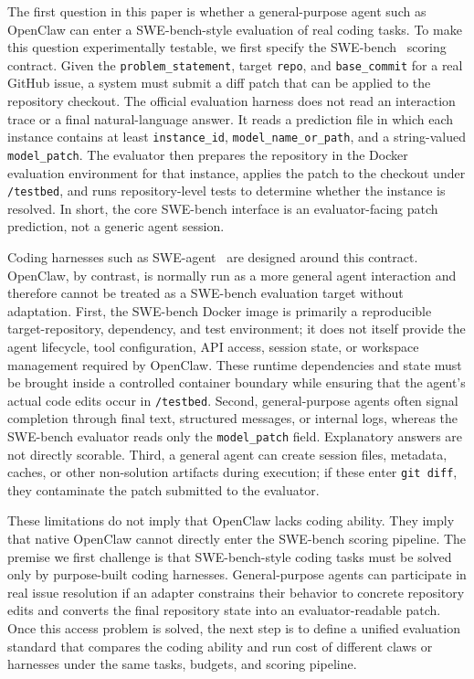 \documentclass{llmxive}
\begin{document}
The first question in this paper is whether a general-purpose agent such as OpenClaw can enter a SWE-bench-style evaluation of real coding tasks. To make this question experimentally testable, we first specify the SWE-bench~\cite{jimenez_swebench_2024} scoring contract. Given the \texttt{problem\_statement}, target \texttt{repo}, and \texttt{base\_commit} for a real GitHub issue, a system must submit a diff patch that can be applied to the repository checkout. The official evaluation harness does not read an interaction trace or a final natural-language answer. It reads a prediction file in which each instance contains at least \texttt{instance\_id}, \texttt{model\_name\_or\_path}, and a string-valued \texttt{model\_patch}. The evaluator then prepares the repository in the Docker evaluation environment for that instance, applies the patch to the checkout under \texttt{/testbed}, and runs repository-level tests to determine whether the instance is resolved. In short, the core SWE-bench interface is an evaluator-facing patch prediction, not a generic agent session.

Coding harnesses such as SWE-agent~\cite{swe_agent} are designed around this contract. OpenClaw, by contrast, is normally run as a more general agent interaction and therefore cannot be treated as a SWE-bench evaluation target without adaptation. First, the SWE-bench Docker image is primarily a reproducible target-repository, dependency, and test environment; it does not itself provide the agent lifecycle, tool configuration, API access, session state, or workspace management required by OpenClaw. These runtime dependencies and state must be brought inside a controlled container boundary while ensuring that the agent's actual code edits occur in \texttt{/testbed}. Second, general-purpose agents often signal completion through final text, structured messages, or internal logs, whereas the SWE-bench evaluator reads only the \texttt{model\_patch} field. Explanatory answers are not directly scorable. Third, a general agent can create session files, metadata, caches, or other non-solution artifacts during execution; if these enter \texttt{git diff}, they contaminate the patch submitted to the evaluator.

These limitations do not imply that OpenClaw lacks coding ability. They imply that native OpenClaw cannot directly enter the SWE-bench scoring pipeline. The premise we first challenge is that SWE-bench-style coding tasks must be solved only by purpose-built coding harnesses. General-purpose agents can participate in real issue resolution if an adapter constrains their behavior to concrete repository edits and converts the final repository state into an evaluator-readable patch. Once this access problem is solved, the next step is to define a unified evaluation standard that compares the coding ability and run cost of different claws or harnesses under the same tasks, budgets, and scoring pipeline.
\end{document}
